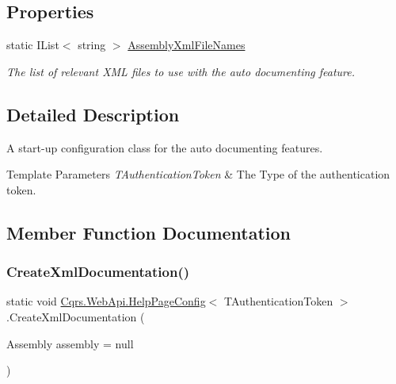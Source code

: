 \subsection*{Properties}
\begin{DoxyCompactItemize}
\item 
static I\+List$<$ string $>$ \hyperlink{classCqrs_1_1WebApi_1_1HelpPageConfig_a62d6b1d61b668f53f5394b26e1c0b0fa_a62d6b1d61b668f53f5394b26e1c0b0fa}{Assembly\+Xml\+File\+Names}
\begin{DoxyCompactList}\small\item\em The list of relevant X\+ML files to use with the auto documenting feature. \end{DoxyCompactList}\end{DoxyCompactItemize}


\subsection{Detailed Description}
A start-\/up configuration class for the auto documenting features. 


\begin{DoxyTemplParams}{Template Parameters}
{\em T\+Authentication\+Token} & The Type of the authentication token.\\
\hline
\end{DoxyTemplParams}


\subsection{Member Function Documentation}
\mbox{\label{classCqrs_1_1WebApi_1_1HelpPageConfig_a1596c74d98fd628b646885dcac056cc1_a1596c74d98fd628b646885dcac056cc1}} 
\subsubsection{\texorpdfstring{Create\+Xml\+Documentation()}{CreateXmlDocumentation()}}
{\footnotesize\ttfamily static void \hyperlink{classCqrs_1_1WebApi_1_1HelpPageConfig}{Cqrs.\+Web\+Api.\+Help\+Page\+Config}$<$ T\+Authentication\+Token $>$.Create\+Xml\+Documentation (\begin{DoxyParamCaption}\item[{Assembly}]{assembly = {\ttfamily null} }\end{DoxyParamCaption})\hspace{0.3cm}{\ttfamily [static]}}



